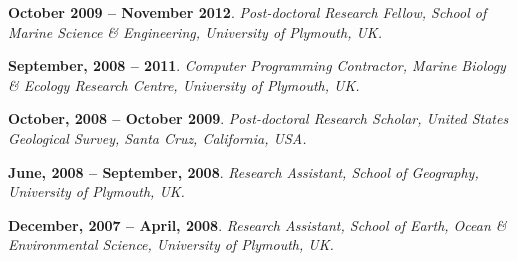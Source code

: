 \documentclass[margin,line]{resume}
\begin{document}
\begin{resume}
\begin{footnotesize}
    {\bf October 2009 -- November 2012}. {\sl Post-doctoral Research Fellow, School of Marine Science \& Engineering, University of Plymouth, UK.} %

    {\bf September, 2008 -- 2011}. {\sl Computer Programming Contractor, Marine Biology \& Ecology Research Centre, University of Plymouth, UK.} %

    {\bf October, 2008 -- October 2009}. {\sl Post-doctoral Research Scholar, United States Geological Survey, Santa Cruz, California, USA.} %

    {\bf June, 2008 -- September, 2008}. {\sl Research Assistant, School of Geography, University of Plymouth, UK.} %

    {\bf December, 2007 -- April, 2008}. {\sl Research Assistant, School of Earth, Ocean \& Environmental Science, University of Plymouth, UK.} %


\end{footnotesize}
\end{resume}
\end{document}
